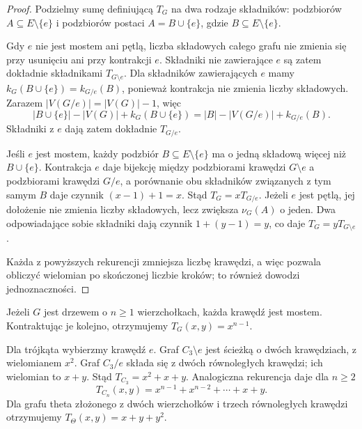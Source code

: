 \begin{proof}
Podzielmy sumę definiującą $T_G$ na dwa rodzaje składników:
podzbiorów $A\subseteq E\setminus\{e\}$ i podzbiorów
postaci $A=B\cup\{e\}$, gdzie $B\subseteq E\setminus\{e\}$.

Gdy $e$ nie jest mostem ani pętlą, liczba składowych całego
grafu nie zmienia się przy usunięciu ani przy kontrakcji $e$.
Składniki nie zawierające $e$ są zatem dokładnie składnikami
$T_{G\setminus e}$. Dla składników zawierających $e$ mamy
$k_G(B\cup\{e\})=k_{G/e}(B)$, ponieważ kontrakcja
nie zmienia liczby składowych. Zarazem
$|V(G/e)|=|V(G)|-1$, więc
\[
|B\cup\{e\}|-|V(G)|+k_G(B\cup\{e\})
=|B|-|V(G/e)|+k_{G/e}(B).
\]
Składniki z $e$ dają zatem dokładnie $T_{G/e}$.

Jeśli $e$ jest mostem, każdy podzbiór $B\subseteq E\setminus\{e\}$
ma o jedną składową więcej niż $B\cup\{e\}$.
Kontrakcja $e$ daje bijekcję między podzbiorami krawędzi
$G\setminus e$ a podzbiorami krawędzi $G/e$, a porównanie
obu składników związanych z tym samym $B$ daje czynnik
$(x-1)+1=x$. Stąd $T_G=xT_{G/e}$.
Jeżeli $e$ jest pętlą, jej dołożenie nie zmienia liczby
składowych, lecz zwiększa $\nu_G(A)$ o jeden.
Dwa odpowiadające sobie składniki dają czynnik
$1+(y-1)=y$, co daje $T_G=yT_{G\setminus e}$.

Każda z powyższych rekurencji zmniejsza liczbę krawędzi,
a więc pozwala obliczyć wielomian po skończonej liczbie
kroków; to również dowodzi jednoznaczności.
\end{proof}

\begin{przyklad}
Jeżeli $G$ jest drzewem o $n\ge1$ wierzchołkach,
każda krawędź jest mostem. Kontraktując je kolejno,
otrzymujemy $T_G(x,y)=x^{n-1}$.

Dla trójkąta wybierzmy krawędź $e$.
Graf $C_3\setminus e$ jest ścieżką o dwóch krawędziach,
z wielomianem $x^2$. Graf $C_3/e$ składa się z dwóch
równoległych krawędzi; ich wielomian to $x+y$.
Stąd
$T_{C_3}=x^2+x+y$.
Analogiczna rekurencja daje dla $n\ge2$
\[
 T_{C_n}(x,y)=x^{n-1}+x^{n-2}+\cdots+x+y.
\]
Dla grafu theta złożonego z dwóch wierzchołków
i trzech równoległych krawędzi otrzymujemy
$T_{\Theta}(x,y)=x+y+y^2$.
\end{przyklad}

